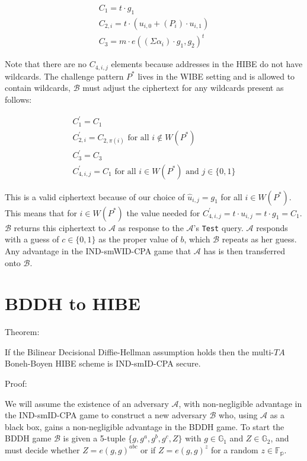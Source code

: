 \documentclass[10pt]{article}
\newcommand{\A}{\mathcal{A}}
\newcommand{\B}{\mathcal{B}}
\newcommand{\TA}{\mathit{TA}}
\begin{document}
\begin{align*}
C_1 = t \cdot g_1\\
C_{2,i} = t \cdot (u_{i,0} + (P_i) \cdot u_{i,1})\\
C_3 = m \cdot e((\Sigma \alpha_i) \cdot g_1, g_2)^t
\end{align*}

Note that there are no $C_{4,i,j}$ elements because addresses in the HIBE do not have wildcards.  The challenge pattern $P^*$ lives in the WIBE setting and is allowed to contain wildcards, $\B$ must adjust the ciphertext for any wildcards present as follows:

\begin{align*}
C^\prime_1 = C_1\\
C^\prime_{2,i} = C_{2,\pi(i)} \text{ for all } i \not\in W(P^*)\\
C^\prime_3 = C_3\\
C^\prime_{4,i,j} = C_1 \text{ for all } i \in W(P^*) \text{ and } j \in \{0,1\}
\end{align*}

This is a valid ciphertext because of our choice of $\hat u_{i,j} = g_1$ for all $i \in W(P^*)$.  This means that for $i \in W(P^*)$ the value needed for $C^\prime_{4,i,j} = t \cdot u_{i,j} = t \cdot g_1 = C_1$.  $\B$ returns this ciphertext to $\A$ as response to the $\A$'s \texttt{Test} query.  $\A$ responds with a guess of $c \in \{0,1\}$ as the proper value of $b$, which $\B$ repeats as her guess.  Any advantage in the IND-smWID-CPA game that $\A$ has is then transferred onto $\B$.

\section*{BDDH to HIBE}

Theorem:

If the Bilinear Decisional Diffie-Hellman assumption holds then the multi-$\TA$ Boneh-Boyen HIBE scheme is IND-smID-CPA secure.

Proof:

We will assume the existence of an adversary $\A$, with non-negligible advantage in the IND-smID-CPA game to construct a new adversary $\B$ who, using $\A$ as a black box, gains a non-negligible advantage in the BDDH game. To start the BDDH game $\B$ is given a 5-tuple $\{g, g^a, g^b, g^c, Z\}$ with $g \in \mathbb{G}_1$ and $Z \in \mathbb{G}_2$, and must decide whether $Z = e(g,g)^{abc}$ or if $Z = e(g,g)^z$ for a random $z \in \mathbb{F_p}$.
\end{document}
